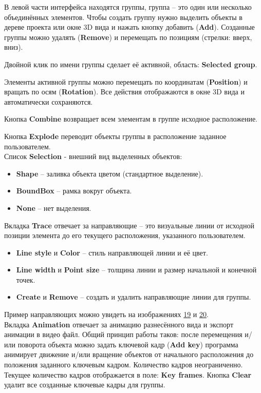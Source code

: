 \documentclass[a4paper,12pt]{article}
\begin{document}
В левой части интерфейса находятся группы, группа -- это один или несколько объединённых элементов. Чтобы создать группу нужно выделить объекты в дереве проекта или окне 3D вида и нажать кнопку добавить (\textbf{Add}). Созданные группы можно удалять (\textbf{Remove}) и перемещать по позициям (стрелки: вверх, вниз).

Двойной клик по имени группы сделает её активной, область: \textbf{Selected group}.

Элементы активной группы можно перемещать по координатам (\textbf{Position}) и вращать по осям (\textbf{Rotation}). Все действия отображаются в окне 3D вида и автоматически сохраняются.

Кнопка \textbf{Combine} возвращает всем элементам в группе исходное расположение.

Кнопка \textbf{Explode} переводит объекты группы в расположение заданное пользователем.\\

Список \textbf{Selection} - внешний вид выделенных объектов:
\begin{itemize}
	\item \textbf{Shape} -- заливка объекта цветом (стандартное выделение).
	\item \textbf{BoundBox} -- рамка вокруг объекта.
	\item \textbf{None} -- нет выделения.
\end{itemize}

\pagebreak


Вкладка \textbf{Trace} отвечает за направляющие -- это визуальные линии от исходной позиции элемента до его текущего расположения, указанного пользователем.
\begin{itemize}
	\item \textbf{Line style} и \textbf{Color} -- стиль направляющей линии и её цвет.
	\item \textbf{Line width} и \textbf{Point size} -- толщина линии и размер начальной и конечной точек.
	\item \textbf{Create} и \textbf{Remove} -- создать и удалить направляющие линии для группы.
\end{itemize}
Пример направляющих можно увидеть на изображениях \hyperref[sec:exploded_m_result]{19} и \hyperref[sec:exploded_d_result]{20}.\\

Вкладка \textbf{Animation} отвечает за анимацию разнесённого вида и экспорт анимации в видео файл.
Общий принцип работы таков: после перемещения и/или поворота объекта можно задать ключевой кадр (\textbf{Add key}) программа анимирует движение и/или вращение объектов от начального расположения до положения заданного ключевым кадром. Количество кадров неограниченно. Текущее количество кадров отображается в поле: \textbf{Key frames}. Кнопка \textbf{Clear} удалит все созданные ключевые кадры для группы.\\
\end{document}

